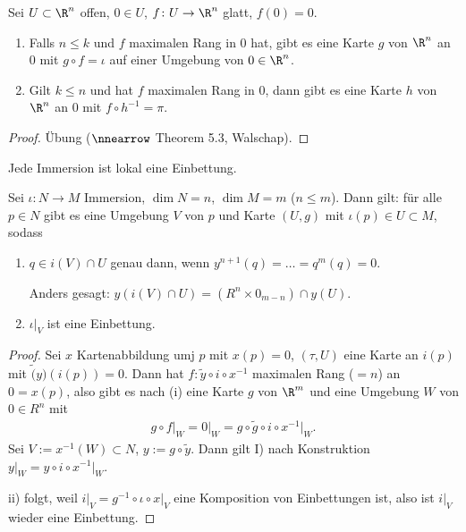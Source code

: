 \begin{proposition}
	Sei $U\subset\R^n$ offen, $0\in U$, $f\colon U\to\R^n$ glatt, $f(0) = 0$.\begin{enumerate}[label={(\roman*)}]
		\item Falls $n\le k$ und $f$ maximalen Rang in $0$ hat, gibt es eine Karte $g$ von $\R^n$ an $0$ mit $g\circ f = \iota$ auf einer Umgebung von $0\in\R^n$.
		\item Gilt $k\le n$ und hat $f$ maximalen Rang in $0$, dann gibt es eine Karte $h$ von $\R^n$ an $0$ mit $f\circ h^{-1} = \pi$.
	\end{enumerate}
\end{proposition}

\begin{proof}
	Übung ($\nnearrow$ Theorem 5.3, Walschap).
\end{proof}

Jede Immersion ist lokal eine Einbettung.
\begin{proposition}
	Sei $\iota\colon N\to M$ Immersion, $\dim N = n$, $\dim M=m$ ($n\le m$). Dann gilt: für alle $p\in N$ gibt es eine Umgebung $V$ von $p$ und Karte $(U,g)$ mit $\iota(p)\in U\subset M$, sodass \begin{enumerate}[label={\roman*)}]
		\item $q\in i(V)\cap U$ genau dann, wenn $y^{n+1}(q) = \dots = q^{m}(q) = 0$.
		
		Anders gesagt: $y(i(V)\cap U) = (R^n\times 0_{m-n})\cap y(U)$.
		\item $\iota\big|_V$ ist eine Einbettung.
	\end{enumerate}
\end{proposition}

\begin{proof}
	Sei $x$ Kartenabbildung umj $p$ mit $x(p) = 0$, $(\tau,U)$ eine Karte an $i(p)$ mit $\tilde(y)(i(p)) = 0$. Dann hat $f\colon \tilde y\circ i\circ x^{-1}$ maximalen Rang ($=n$) an $0=x(p)$, also gibt es nach  (i) eine Karte $g$ von $\R^m$ und eine Umgebung $W$ von $0\in R^n$ mit \begin{align*}
		g\circ f\big|_W = 0\big|_W = g\circ\tilde g\circ i\circ x^{-1}\big|_W.
	\end{align*}
	Sei $V:= x^{-1}(W)\subset N$, $y := g\circ\tilde y$. Dann gilt I) nach Konstruktion $y\big|_W = y\circ i\circ x^{-1}\big|_W$.
	
	ii) folgt, weil $i\big|_V = g^{-1}\circ \iota\circ x\big|_V$ eine Komposition von Einbettungen ist, also ist $i\big|_V$ wieder eine Einbettung.
\end{proof}

